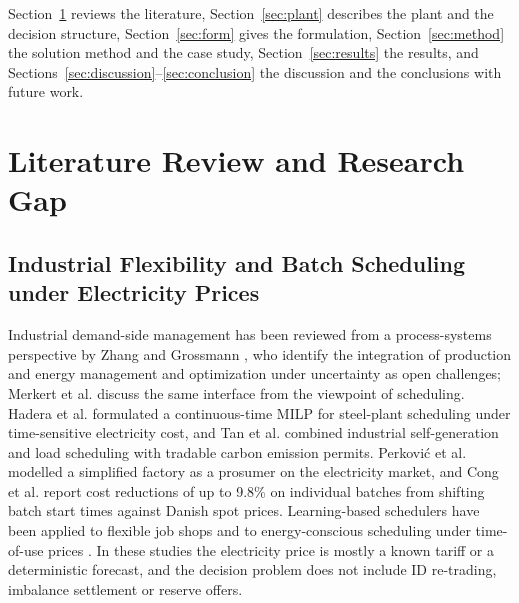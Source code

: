 \documentclass[5p,times,twocolumn]{elsarticle}
\begin{document}
Section~\ref{sec:lit} reviews the literature, Section~\ref{sec:plant} describes the plant and the decision structure, Section~\ref{sec:form} gives the formulation, Section~\ref{sec:method} the solution method and the case study, Section~\ref{sec:results} the results, and Sections~\ref{sec:discussion}--\ref{sec:conclusion} the discussion and the conclusions with future work.

\section{Literature Review and Research Gap}
\label{sec:lit}

\subsection{Industrial Flexibility and Batch Scheduling under Electricity Prices}
Industrial demand-side management has been reviewed from a process-systems perspective by Zhang and Grossmann \cite{Zhang2016}, who identify the integration of production and energy management and optimization under uncertainty as open challenges; Merkert et al. \cite{Merkert2015} discuss the same interface from the viewpoint of scheduling. Hadera et al. \cite{Hadera2015} formulated a continuous-time MILP for steel-plant scheduling under time-sensitive electricity cost, and Tan et al. \cite{Tan2019} combined industrial self-generation and load scheduling with tradable carbon emission permits. Perkovi{\'c} et al. \cite{Perkovi2017} modelled a simplified factory as a prosumer on the electricity market, and Cong et al. \cite{Cong2026} report cost reductions of up to 9.8\% on individual batches from shifting batch start times against Danish spot prices. Learning-based schedulers have been applied to flexible job shops and to energy-conscious scheduling under time-of-use prices \cite{Song2023,wang2025,felder2023}. In these studies the electricity price is mostly a known tariff or a deterministic forecast, and the decision problem does not include ID re-trading, imbalance settlement or reserve offers.
\end{document}
